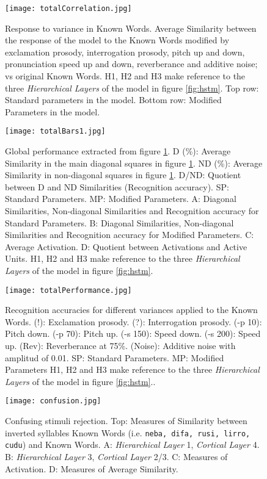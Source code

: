 \documentclass[11pt,a4paper]{article}
\begin{document}
\begin{figure}[h]
\centering
\texttt{[image: totalCorrelation.jpg]}
\caption{\scriptsize{Response to variance in Known Words.
Average Similarity between the response of the model to the Known Words modified by
exclamation prosody, interrogation prosody, pitch up and down,
pronunciation speed up and down, reverberance and additive noise;
vs original Known Words.
H1, H2 and H3 make reference to the three \textit{Hierarchical Layers} of the model in figure \ref{fig:hstm}.
Top row: Standard parameters in the model.
Bottom row: Modified Parameters in the model.}}
\label{fig:totalCorrelation}
\end{figure}

\begin{figure}[h]
\centering
\texttt{[image: totalBars1.jpg]}
\caption{\scriptsize{Global performance extracted from figure \ref{fig:totalCorrelation}.
D (\%): Average Similarity in the main diagonal squares in figure \ref{fig:totalCorrelation}.
ND (\%): Average Similarity in non-diagonal squares in figure \ref{fig:totalCorrelation}.
D/ND: Quotient between D and ND Similarities (Recognition accuracy).
SP: Standard Parameters.
MP: Modified Parameters.
A: Diagonal Similarities, Non-diagonal Similarities and Recognition accuracy for Standard Parameters.
B: Diagonal Similarities, Non-diagonal Similarities and Recognition accuracy for Modified Parameters.
C: Average Activation.
D: Quotient between Activations and Active Units.
H1, H2 and H3 make reference to the three \textit{Hierarchical Layers} of the model in figure \ref{fig:hstm}.}}
\label{fig:totalBars1}
\end{figure}

\begin{figure}[h]
\centering
\texttt{[image: totalPerformance.jpg]}
\caption{\scriptsize{Recognition accuracies for different variances applied
to the Known Words.
(!): Exclamation prosody.
(?): Interrogation prosody.
(-p 10): Pitch down.
(-p 70): Pitch up.
(-s 150): Speed down.
(-s 200): Speed up.
(Rev): Reverberance at 75\%.
(Noise): Additive noise with amplitud of 0.01.
SP: Standard Parameters.
MP: Modified Parameters
H1, H2 and H3 make reference to the three \textit{Hierarchical Layers} of the model in figure \ref{fig:hstm}..}}
\label{fig:totalPerformance}
\end{figure}

\begin{figure}[h]
\centering
\texttt{[image: confusion.jpg]}
\caption{\scriptsize{Confusing stimuli rejection.
Top: Measures of Similarity between inverted syllables Known Words
(i.e. \texttt{neba, difa, rusi, lirro, cudu}) and Known Words.
A: \textit{Hierarchical Layer} 1, \textit{Cortical Layer} 4.
B: \textit{Hierarchical Layer} 3, \textit{Cortical Layer} 2/3.
C: Measures of Activation.
D: Measures of Average Similarity.}}
\label{fig:confusion}
\end{figure}
\end{document}
